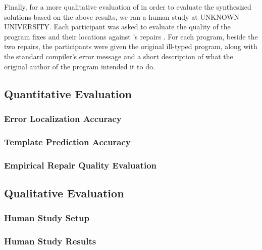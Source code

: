 Finally, for a more qualitative evaluation of \toolname in order to evaluate the
synthesized solutions based on the above results, we ran a human study at
UNKNOWN UNIVERSITY. Each participant was asked to evaluate the quality of the
program fixes and their locations against \seminal's repairs
\citep[][]{Lerner2006-pj, Lerner2007-dt}. For each program, beside the two
repairs, the participants were given the original ill-typed program, along with
the standard \ocaml compiler's error message and a short description of what the
original author of the program intended it to do.

\subsection{Quantitative Evaluation}
\label{subsec:quan_eval}

\subsubsection{Error Localization Accuracy}
\label{subsubsec:error_loc_acc}

\subsubsection{Template Prediction Accuracy}
\label{subsubsec:templ_acc}

\subsubsection{Empirical Repair Quality Evaluation}
\label{subsubsec:man_rep_qual_eval}



\subsection{Qualitative Evaluation}
\label{subsec:quan_eval}

\subsubsection{Human Study Setup}
\label{subsubsec:study_setup}


\subsubsection{Human Study Results}
\label{subsubsec:study_res}
